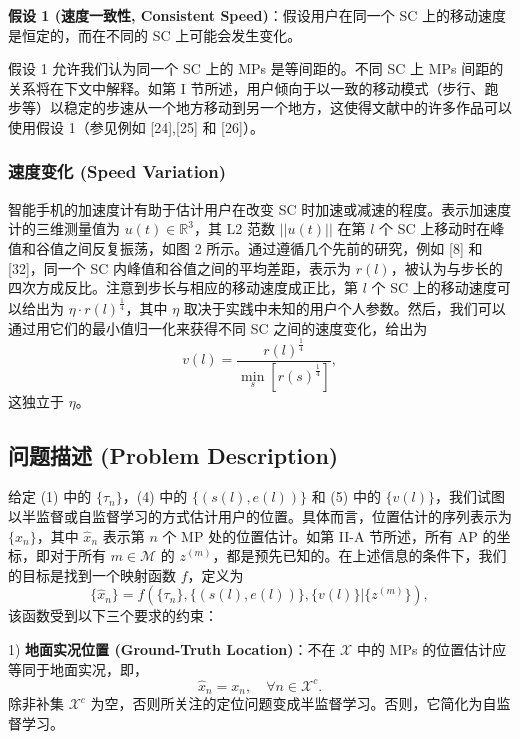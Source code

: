\documentclass[journal]{IEEEtran}
\begin{document}
\textbf{假设 1 (速度一致性, Consistent Speed)}：假设用户在同一个 SC 上的移动速度是恒定的，而在不同的 SC 上可能会发生变化。

假设 1 允许我们认为同一个 SC 上的 MPs 是等间距的。不同 SC 上 MPs 间距的关系将在下文中解释。如第 I 节所述，用户倾向于以一致的移动模式（步行、跑步等）以稳定的步速从一个地方移动到另一个地方，这使得文献中的许多作品可以使用假设 1（参见例如 [24],[25] 和 [26]）。

\subsubsection{速度变化 (Speed Variation)}
智能手机的加速度计有助于估计用户在改变 SC 时加速或减速的程度。表示加速度计的三维测量值为 $u(t)\in\mathbb{R}^{3}$，其 L2 范数 $||u(t)||$ 在第 $l$ 个 SC 上移动时在峰值和谷值之间反复振荡，如图 2 所示。通过遵循几个先前的研究，例如 [8] 和 [32]，同一个 SC 内峰值和谷值之间的平均差距，表示为 $r(l)$，被认为与步长的四次方成反比。注意到步长与相应的移动速度成正比，第 $l$ 个 SC 上的移动速度可以给出为 $\eta\cdot r(l)^{\frac{1}{4}}$，其中 $\eta$ 取决于实践中未知的用户个人参数。然后，我们可以通过用它们的最小值归一化来获得不同 SC 之间的速度变化，给出为
\begin{equation}
v(l)=\frac{r(l)^{\frac{1}{4}}}{\min_{s}[r(s)^{\frac{1}{4}}]}, \label{eq:5}
\end{equation}
这独立于 $\eta$。

\subsection{问题描述 (Problem Description)}
给定 (1) 中的 $\{\tau_{n}\}$，(4) 中的 $\{(s(l),e(l))\}$ 和 (5) 中的 $\{v(l)\}$，我们试图以半监督或自监督学习的方式估计用户的位置。具体而言，位置估计的序列表示为 $\{\hat{x}_{n}\}$，其中 $\hat{x}_{n}$ 表示第 $n$ 个 MP 处的位置估计。如第 II-A 节所述，所有 AP 的坐标，即对于所有 $m\in\mathcal{M}$ 的 $z^{(m)}$，都是预先已知的。在上述信息的条件下，我们的目标是找到一个映射函数 $f$，定义为
\begin{equation}
\{\hat{x}_{n}\}=f(\{\tau_{n}\},\{(s(l),e(l))\},\{v(l)\}|\{z^{(m)}\}), \label{eq:6}
\end{equation}
该函数受到以下三个要求的约束：

1) \textbf{地面实况位置 (Ground-Truth Location)}：不在 $\mathcal{X}$ 中的 MPs 的位置估计应等同于地面实况，即，
\begin{equation}
\hat{x}_{n}=x_{n}, \quad \forall n\in\mathcal{X}^{c}. \label{eq:7}
\end{equation}
除非补集 $\mathcal{X}^{c}$ 为空，否则所关注的定位问题变成半监督学习。否则，它简化为自监督学习。
\end{document}
